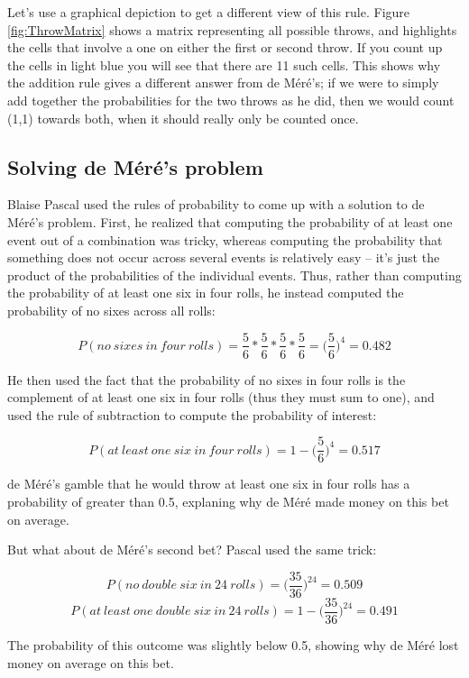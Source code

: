 \documentclass[]{book}
\theoremstyle{definition}
\theoremstyle{definition}
\theoremstyle{definition}
\theoremstyle{remark}
\begin{document}
Let's use a graphical depiction to get a different view of this rule.
Figure \ref{fig:ThrowMatrix} shows a matrix representing all possible
throws, and highlights the cells that involve a one on either the first
or second throw. If you count up the cells in light blue you will see
that there are 11 such cells. This shows why the addition rule gives a
different answer from de Méré's; if we were to simply add together the
probabilities for the two throws as he did, then we would count (1,1)
towards both, when it should really only be counted once.

\subsection{Solving de Méré's problem}\label{solving-de-meres-problem}

Blaise Pascal used the rules of probability to come up with a solution
to de Méré's problem. First, he realized that computing the probability
of at least one event out of a combination was tricky, whereas computing
the probability that something does not occur across several events is
relatively easy -- it's just the product of the probabilities of the
individual events. Thus, rather than computing the probability of at
least one six in four rolls, he instead computed the probability of no
sixes across all rolls:

\[
P(no\ sixes\ in\ four\ rolls) = \frac{5}{6}*\frac{5}{6}*\frac{5}{6}*\frac{5}{6}=\bigg(\frac{5}{6}\bigg)^4=0.482
\]

He then used the fact that the probability of no sixes in four rolls is
the complement of at least one six in four rolls (thus they must sum to
one), and used the rule of subtraction to compute the probability of
interest:

\[
P(at\ least\ one\ six\ in\ four\ rolls) = 1 - \bigg(\frac{5}{6}\bigg)^4=0.517
\]

de Méré's gamble that he would throw at least one six in four rolls has
a probability of greater than 0.5, explaning why de Méré made money on
this bet on average.

But what about de Méré's second bet? Pascal used the same trick:

\[
P(no\ double\ six\ in\ 24\ rolls) = \bigg(\frac{35}{36}\bigg)^{24}=0.509
\] \[
P(at\ least\ one\ double\ six\ in\ 24\ rolls) = 1 - \bigg(\frac{35}{36}\bigg)^{24}=0.491
\]

The probability of this outcome was slightly below 0.5, showing why de
Méré lost money on average on this bet.
\end{document}
